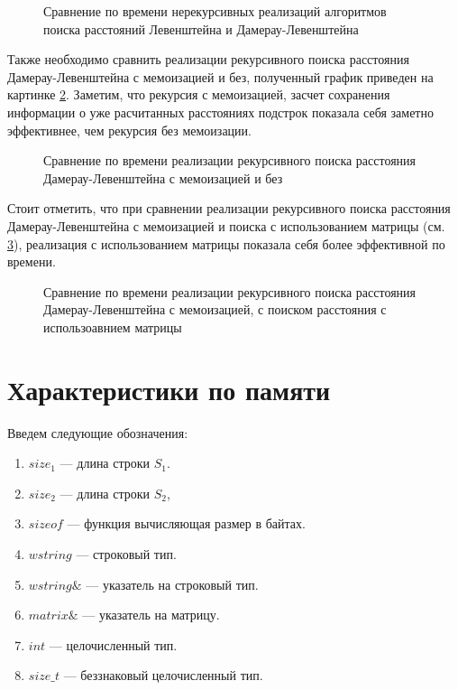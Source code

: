 \begin{figure}[h]
	\centering
	
	\caption{Сравнение по времени нерекурсивных реализаций алгоритмов поиска расстояний Левенштейна и Дамерау-Левенштейна}
	\label{plt:time_matrix_cmp}
\end{figure}

Также необходимо сравнить реализации рекурсивного поиска расстояния Дамерау-Левенштейна с мемоизацией и без, полученный график приведен
на картинке \ref{plt:time_rec_cmp}. Заметим, что рекурсия с мемоизацией, засчет сохранения информации о уже расчитанных расстояниях подстрок
показала себя заметно эффективнее, чем рекурсия без мемоизации. 


\begin{figure}[h]
	\centering
	
	\caption{Сравнение по времени реализации рекурсивного поиска расстояния Дамерау-Левенштейна с мемоизацией и без}
	\label{plt:time_rec_cmp}
\end{figure}

Стоит отметить, что при сравнении реализации рекурсивного поиска расстояния Дамерау-Левенштейна с  мемоизацией и поиска
с использованием матрицы (см. \ref{plt:time_mat_rec_cmp}), реализация с использованием матрицы показала себя более эффективной
по времени. 

\begin{figure}[h]
	\centering
	
	\caption{Сравнение по времени реализации рекурсивного поиска расстояния Дамерау-Левенштейна с  мемоизацией, с поиском
	расстояния с использоавнием матрицы}
	\label{plt:time_mat_rec_cmp}
\end{figure}


\section{Характеристики по памяти}

Введем следующие обозначения:
\begin{enumerate}
	\item $size_{1}$ --- длина строки $S_{1}$.
	\item $size_{2}$ --- длина строки $S_{2}$,
	\item $sizeof$ --- функция вычисляющая размер в байтах.
	\item $wstring$ --- строковый тип.
	\item $wstring\&$ --- указатель на строковый тип.
	\item $matrix\&$ --- указатель на матрицу.
	\item $int$ --- целочисленный тип.
	\item $size\_t$ --- беззнаковый целочисленный тип.
\end{enumerate}

